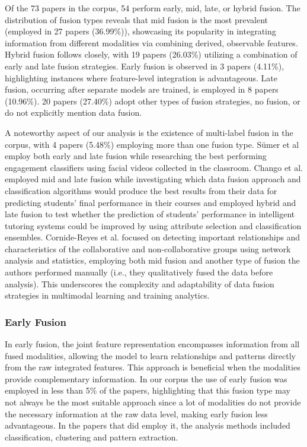 \documentclass[manuscript,screen,review]{acmart}
\begin{document}
Of the 73 papers in the corpus, 54 perform early, mid, late, or hybrid fusion. The distribution of fusion types reveals that mid fusion is the most prevalent (employed in 27 papers (36.99\%)), showcasing its popularity in integrating information from different modalities via combining derived, observable features. Hybrid fusion follows closely, with 19 papers (26.03\%) utilizing a combination of early and late fusion strategies. Early fusion is observed in 3 papers (4.11\%), highlighting instances where feature-level integration is advantageous. Late fusion, occurring after separate models are trained, is employed in 8 papers (10.96\%). 20 papers (27.40\%) adopt other types of fusion strategies, no fusion, or do not explicitly mention data fusion.

A noteworthy aspect of our analysis is the existence of multi-label fusion in the corpus, with 4 papers (5.48\%) employing more than one fusion type. Sümer et al \cite{1315379489} employ both early and late fusion while researching the best performing engagement classifiers using facial videos collected in the classroom. Chango et al. employed mid and late fusion\cite{2936220551} while investigating which data fusion approach and classification algorithms would produce the best results from their data for predicting students’ final performance in their courses and employed hybrid and late fusion\cite{4277812050} to test whether the prediction of students' performance in intelligent tutoring systems could be improved by using attribute selection and classification ensembles. Cornide-Reyes et al. \cite{4019205162} focused on detecting important relationships and characteristics of the collaborative and non-collaborative groups using network analysis and statistics, employing both mid fusion and another type of fusion the authors performed manually (i.e., they qualitatively fused the data before analysis). This underscores the complexity and adaptability of data fusion strategies in multimodal learning and training analytics. 

\subsubsection{Early Fusion}

In early fusion, the joint feature representation encompasses information from all fused modalities, allowing the model to learn relationships and patterns directly from the raw integrated features. This approach is beneficial when the modalities provide complementary information. In our corpus the use of early fusion was employed in less than 5\% of the papers, highlighting that this fusion type may not always be the most suitable approach since a lot of modalities do not provide the necessary information at the raw data level, making early fusion less advantageous. In the papers that did employ it, the analysis methods included classification, clustering and pattern extraction.
\end{document}
